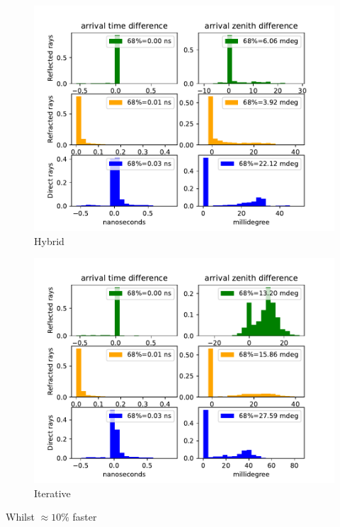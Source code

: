 \documentclass{beamer}
\begin{document}
\begin{frame}
	\begin{minipage}{0.49\textwidth}
	\begin{figure}
		\includegraphics[width=1.1\textwidth]{figures/hybrid_comparison_N_1000.pdf}
		\caption{Hybrid}
	\end{figure}
	\end{minipage}
	\begin{minipage}{0.49\textwidth}
	\begin{figure}
		\includegraphics[width=1.1\textwidth]{figures/iterative_comparison_N_1000.pdf}
		\caption{Iterative}
	\end{figure}
	\end{minipage}
Whilst $\approx 10\%$ faster
\end{frame}
\end{document}

